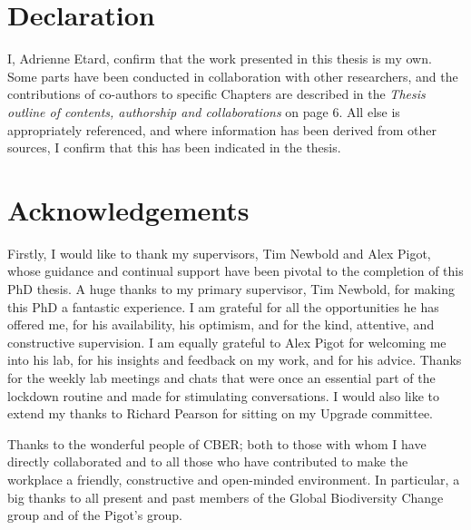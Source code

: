 \documentclass[11pt]{report}
\begin{document}
\begin{refsection}



\chapter*{Declaration}

I, Adrienne Etard, confirm that the work presented in this thesis is my own. Some parts have been conducted in collaboration with other researchers, and the contributions of co-authors to specific Chapters are described in the \textit{Thesis outline of contents, authorship and collaborations} on page 6. All else is appropriately referenced, and where information has been derived from other sources, I confirm that this has been indicated in the thesis.


\clearpage

\chapter*{Acknowledgements}

Firstly, I would like to thank my supervisors, Tim Newbold and Alex Pigot, whose guidance and continual support have been pivotal to the completion of this PhD thesis.
A huge thanks to my primary supervisor, Tim Newbold, for making this PhD a fantastic experience. I am grateful for all the opportunities he has offered me, for his availability, his optimism, and for the kind, attentive, and constructive supervision.
I am equally grateful to Alex Pigot for welcoming me into his lab, for his insights and feedback on my work, and for his advice. Thanks for the weekly lab meetings and chats that were once an essential part of the lockdown routine and made for stimulating conversations.
I would also like to extend my thanks to Richard Pearson for sitting on my Upgrade committee.

Thanks to the wonderful people of CBER; both to those with whom I have directly collaborated and to all those who have contributed to make the workplace a friendly, constructive and open-minded environment. In particular, a big thanks to all present and past members of the Global Biodiversity Change group and of the Pigot’s group.


\end{refsection}
\end{document}
